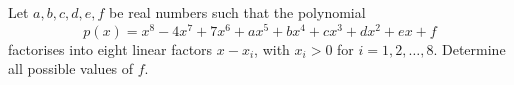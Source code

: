 Let $a,b,c,d,e,f$ be real numbers such that the polynomial \[ p(x)=x^8-4x^7+7x^6+ax^5+bx^4+cx^3+dx^2+ex+f \] factorises into eight linear factors $x-x_i$, with $x_i>0$ for $i=1,2,\ldots,8$. Determine all possible values of $f$.